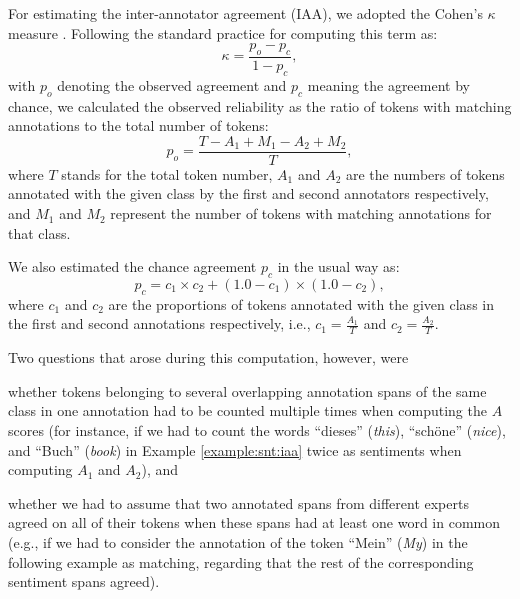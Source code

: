For estimating the inter-annotator agreement (IAA), we adopted the
Cohen's $\kappa$ measure \cite{Cohen:60}.  Following the standard
practice for computing this term as:
\begin{equation*}
  \kappa = \frac{p_o - p_c}{1 - p_c},
\end{equation*}
with $p_o$ denoting the observed agreement and $p_c$ meaning the
agreement by chance, we calculated the observed reliability as the
ratio of tokens with matching annotations to the total number of
tokens:
\begin{equation*}
  p_o = \frac{T - A_1 + M_1 - A_2 + M_2}{T},
\end{equation*}
where $T$ stands for the total token number, $A_1$ and $A_2$ are the
numbers of tokens annotated with the given class by the first and
second annotators respectively, and $M_1$ and $M_2$ represent the
number of tokens with matching annotations for that class.

We also estimated the chance agreement $p_c$ in the usual way as:
\begin{equation*}\textstyle
  p_c = c_1 \times c_2 + (1.0 - c_1) \times (1.0 - c_2),
\end{equation*}
where $c_1$ and $c_2$ are the proportions of tokens annotated with the
given class in the first and second annotations respectively, i.e.,
$c_1 = \frac{A_1}{T}$ and $c_2 = \frac{A_2}{T}$.

Two questions that arose during this computation, however, were
\begin{inparaenum}
  \item whether tokens belonging to several overlapping annotation
    spans of the same class in one annotation had to be counted
    multiple times when computing the $A$ scores (for instance, if we
    had to count the words ``dieses'' (\textit{this}), ``sch\"one''
    (\textit{nice}), and ``Buch'' (\textit{book}) in Example
    \ref{example:snt:iaa} twice as sentiments when computing $A_1$ and
    $A_2$), and
  \item whether we had to assume that two annotated spans from
    different experts agreed on all of their tokens when these spans
    had at least one word in common (e.g., if we had to consider the
    annotation of the token ``Mein'' (\textit{My}) in the following
    example as matching, regarding that the rest of the corresponding
    sentiment spans agreed).
\end{inparaenum}


